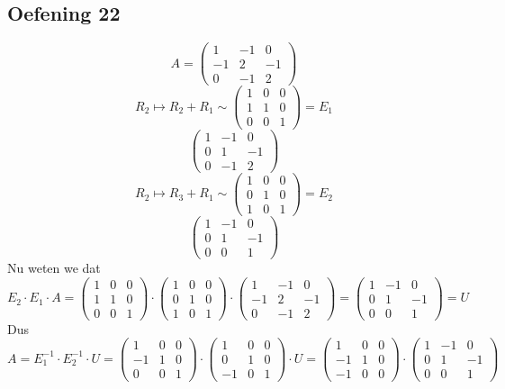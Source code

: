 \documentclass[lineaire_algebra_oplossingen.tex]{subfiles}
\begin{document}
\subsection{Oefening 22}
\[
A=
\begin{pmatrix}
1 & -1 & 0 \\
-1 & 2 & -1 \\
0 & -1 & 2 
\end{pmatrix}
\]
\[
R_2 \longmapsto R_2+R_1 \sim
\begin{pmatrix}
1 & 0 & 0\\
1 & 1 & 0\\
0 & 0 & 1 
\end{pmatrix}
=E_1
\]
\[
\begin{pmatrix}
1 & -1 & 0 \\
0 & 1 & -1 \\
0 & -1 & 2  
\end{pmatrix}
\]
\[
R_2 \longmapsto R_3+R_1 \sim
\begin{pmatrix}
1 & 0 & 0\\
0 & 1 & 0\\
1 & 0 & 1 
\end{pmatrix}
=E_2
\]
\[
\begin{pmatrix}
1 & -1 & 0 \\
0 & 1 & -1 \\
0 & 0 & 1 
\end{pmatrix}
\]
Nu weten we dat
\[
E_2 \cdot E_1 \cdot A 
=
\begin{pmatrix}
1 & 0 & 0\\
1 & 1 & 0\\
0 & 0 & 1 
\end{pmatrix}
\cdot
\begin{pmatrix}
1 & 0 & 0\\
0 & 1 & 0\\
1 & 0 & 1 
\end{pmatrix}
\cdot
\begin{pmatrix}
1 & -1 & 0 \\
-1 & 2 & -1 \\
0 & -1 & 2 
\end{pmatrix}
=
\begin{pmatrix}
1 & -1 & 0 \\
0 & 1 & -1 \\
0 & 0 & 1 
\end{pmatrix}
= U
\]
Dus
\[
A = E_1^{-1} \cdot E_2^{-1} \cdot U
=
\begin{pmatrix}
1 & 0 & 0\\
-1 & 1 & 0\\
0 & 0 & 1 
\end{pmatrix}
\cdot
\begin{pmatrix}
1 & 0 & 0\\
0 & 1 & 0\\
-1 & 0 & 1 
\end{pmatrix}
\cdot
U
=
\begin{pmatrix}
1 & 0 & 0\\
-1 & 1 & 0\\
-1 & 0 & 0
\end{pmatrix}
\cdot
\begin{pmatrix}
1 & -1 & 0 \\
0 & 1 & -1 \\
0 & 0 & 1 
\end{pmatrix}
\]
\end{document}
